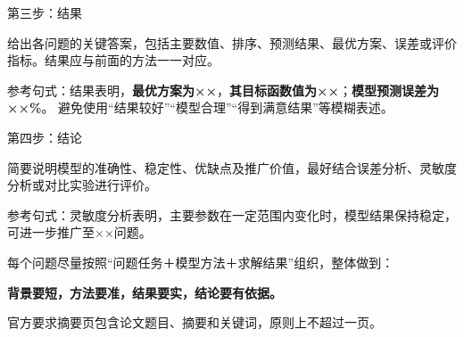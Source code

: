 \documentclass{cumcmthesis}
\begin{document}
第三步：结果

给出各问题的关键答案，包括主要数值、排序、预测结果、最优方案、误差或评价指标。结果应与前面的方法一一对应。

参考句式：结果表明，\textbf{最优方案为××}，\textbf{其目标函数值为××}；\textbf{模型预测误差为××\%}。
避免使用“结果较好”“模型合理”“得到满意结果”等模糊表述。

第四步：结论

简要说明模型的准确性、稳定性、优缺点及推广价值，最好结合误差分析、灵敏度分析或对比实验进行评价。

参考句式：灵敏度分析表明，主要参数在一定范围内变化时，模型结果保持稳定，可进一步推广至××问题。

每个问题尽量按照“问题任务＋模型方法＋求解结果”组织，整体做到：

\textbf{背景要短，方法要准，结果要实，结论要有依据。}

官方要求摘要页包含论文题目、摘要和关键词，原则上不超过一页。



\newpage


\appendix

%
% 
\end{document}
